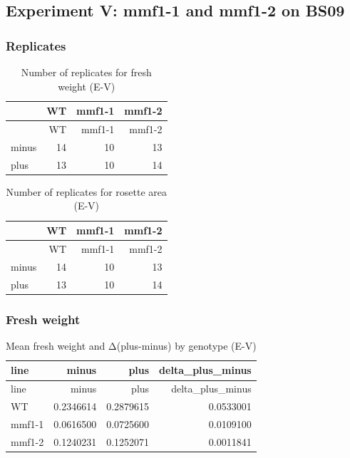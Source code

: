 \documentclass[
  10pt,
]{article}
\begin{document}
\newpage

\subsection{\texorpdfstring{\textbf{Experiment V: mmf1-1 and mmf1-2 on
BS09}}{Experiment V: mmf1-1 and mmf1-2 on BS09}}\label{experiment-v-mmf1-1-and-mmf1-2-on-bs09}

\subsubsection{\texorpdfstring{\textbf{Replicates}}{Replicates}}\label{replicates-2}

\begin{longtable}[]{@{}lrrr@{}}
\caption{Number of replicates for fresh weight (E-V)}\tabularnewline
\toprule\noalign{}
& WT & mmf1-1 & mmf1-2 \\
\midrule\noalign{}
\endfirsthead
\toprule\noalign{}
& WT & mmf1-1 & mmf1-2 \\
\midrule\noalign{}
\endhead
\bottomrule\noalign{}
\endlastfoot
minus & 14 & 10 & 13 \\
plus & 13 & 10 & 14 \\
\end{longtable}

\begin{longtable}[]{@{}lrrr@{}}
\caption{Number of replicates for rosette area (E-V)}\tabularnewline
\toprule\noalign{}
& WT & mmf1-1 & mmf1-2 \\
\midrule\noalign{}
\endfirsthead
\toprule\noalign{}
& WT & mmf1-1 & mmf1-2 \\
\midrule\noalign{}
\endhead
\bottomrule\noalign{}
\endlastfoot
minus & 14 & 10 & 13 \\
plus & 13 & 10 & 14 \\
\end{longtable}

\subsubsection{Fresh weight}\label{fresh-weight-2}

\begin{longtable}[]{@{}lrrr@{}}
\caption{Mean fresh weight and Δ(plus-minus) by genotype
(E-V)}\tabularnewline
\toprule\noalign{}
line & minus & plus & delta\_plus\_minus \\
\midrule\noalign{}
\endfirsthead
\toprule\noalign{}
line & minus & plus & delta\_plus\_minus \\
\midrule\noalign{}
\endhead
\bottomrule\noalign{}
\endlastfoot
WT & 0.2346614 & 0.2879615 & 0.0533001 \\
mmf1-1 & 0.0616500 & 0.0725600 & 0.0109100 \\
mmf1-2 & 0.1240231 & 0.1252071 & 0.0011841 \\
\end{longtable}
\end{document}
